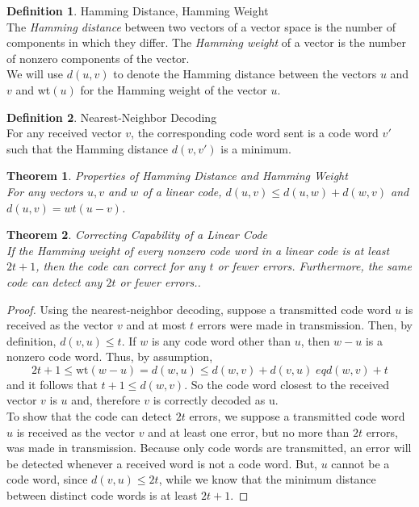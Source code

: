 \documentclass{article}
\newtheorem{theorem}{Theorem}
\theoremstyle{definition}
\newtheorem{definition}{Definition}
\begin{document}
\begin{definition}{Hamming Distance, Hamming Weight}\\The \textit{Hamming distance} between two vectors of a vector space is the number of components in which they differ. The \textit{Hamming weight} of a vector is the number of nonzero components of the vector.\\ We will use $d(u,v)$ to denote the Hamming distance between the vectors $u$ and $v$ and wt$(u)$ for the Hamming weight of the vector $u$.
\end{definition}

\begin{definition}{Nearest-Neighbor Decoding}\\
  For any received vector $v$, the corresponding code word sent is a code word $v'$ such that the Hamming distance $d(v,v')$ is a minimum.
\end{definition}

\begin{theorem}{Properties of Hamming Distance and Hamming Weight}\\
For any vectors $u,v$ and $w$ of a linear code, $d(u,v)\leq d(u,w)+d(w,v)$ and $d(u,v)=wt(u-v)$.
\end{theorem}

\begin{theorem}{Correcting Capability of a Linear Code}\\
If the Hamming weight of every nonzero code word in a linear code is at least $2t+1$, then the code can correct for any $t$ or fewer errors. Furthermore, the same code can detect any $2t$ or fewer errors..
\end{theorem}

\begin{proof}
  Using the nearest-neighbor decoding, suppose a transmitted code word $u$ is received as the vector $v$ and at most $t$ errors were made in transmission. Then, by definition, $d(v,u)\leq t$. If $w$ is any code word other than $u$, then $w-u$ is a nonzero code word. Thus, by assumption,
  \[2t+1 \leq \text{wt}(w-u) = d(w,u) \leq d(w,v) + d(v,u) \;eq d(w,v) + t\]
  and it follows that $t+1 \leq d(w,v).$ So the code word closest to the received vector $v$ is $u$ and, therefore $v$ is correctly decoded as u.\\
  To show that the code can detect $2t$ errors, we suppose a transmitted code word $u$ is received as the vector $v$ and at least one error, but no more than $2t$ errors, was made in transmission. Because only code words are transmitted, an error will be detected whenever a received word is not a code word. But, $u$ cannot be a code word, since $d(v,u) \leq 2t$, while we know that the minimum distance between distinct code words is at least $2t+1$.
\end{proof}
\end{document}
